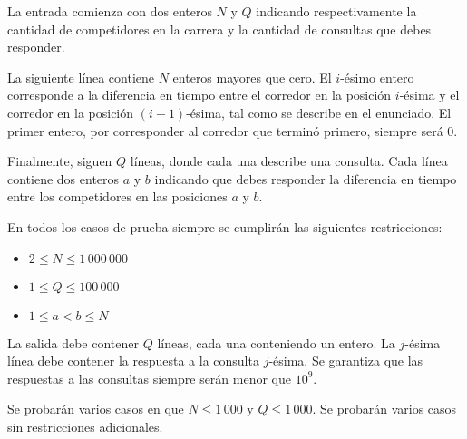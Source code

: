 \documentclass{oci}
\begin{document}
\begin{inputDescription}
  La entrada comienza con dos enteros $N$ y $Q$ indicando respectivamente la cantidad de
  competidores en la carrera y la cantidad de consultas que debes responder.

  La siguiente línea contiene $N$ enteros mayores que cero.
  El $i$-ésimo entero corresponde a la diferencia en tiempo entre el corredor en la posición
  $i$-ésima y el corredor en la posición $(i-1)$-ésima, tal como se describe en el enunciado.
  El primer entero, por corresponder al corredor que terminó primero, siempre será 0.
  
  Finalmente, siguen $Q$ líneas, donde cada una describe una consulta.
  Cada línea contiene dos enteros $a$ y $b$ indicando que debes
  responder la diferencia en tiempo entre los competidores en las posiciones $a$ y $b$.

  En todos los casos de prueba siempre se cumplirán las siguientes restricciones:
  \begin{itemize}
  \item $2 \leq N \leq 1\,000\,000$
  \item $1 \leq Q \leq 100\,000$
  \item $1 \leq a < b \leq N$
  \end{itemize}
\end{inputDescription}

\begin{outputDescription}
  La salida debe contener $Q$ líneas, cada una conteniendo un entero.
  La $j$-ésima línea debe contener la respuesta a la consulta $j$-ésima.
  Se garantiza que las respuestas a las consultas siempre serán menor que $10^9$.
\end{outputDescription}

\begin{scoreDescription}
  Se probarán varios casos en que $N \leq 1\,000$ y $Q \leq 1\,000$.
  Se probarán varios casos sin restricciones adicionales.
\end{scoreDescription}

\begin{sampleDescription}
\end{sampleDescription}
\end{document}
